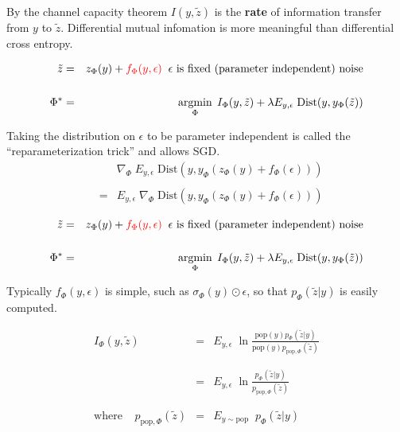 {\vfill
By the channel capacity theorem {\color{red} $I(y,\tilde{z})$} is the {\bf rate} of information transfer from $y$ to $\tilde{z}$.
Differential mutual infomation is more meaningful than differential cross entropy.


\bigskip
\bigskip
\begin{eqnarray*}
\tilde{z} & = & z_\Phi(y) + {\color{red} f_\Phi(y,\epsilon)} \;\;\mbox{$\epsilon$ is fixed (parameter independent) noise} \\
\\
\Phi^* & = & \operatorname*{argmin}_\Phi \;I_\Phi(y,\tilde{z}) + \lambda E_{y,\epsilon}\; \mathrm{Dist}(y,y_\Phi(\tilde{z}))
\end{eqnarray*}

\vfill
Taking the distribution on $\epsilon$ to be parameter independent is called the ``reparameterization trick'' and allows SGD.
\begin{eqnarray*}
& & \nabla_\Phi \;E_{y,\epsilon}\; \mathrm{Dist}(y,y_\Phi(z_\Phi(y) + f_\Phi(\epsilon))) \\
\\
& = & E_{y,\epsilon}\; \nabla_\Phi\;\mathrm{Dist}(y,y_\Phi(z_\Phi(y) + f_\Phi(\epsilon)))
\end{eqnarray*}


\bigskip
\bigskip
\begin{eqnarray*}
\tilde{z} & = & z_\Phi(y) + {\color{red} f_\Phi(y,\epsilon)} \;\;\mbox{$\epsilon$ is fixed (parameter independent) noise} \\
\\
\Phi^* & = & \operatorname*{argmin}_\Phi \;I_\Phi(y,\tilde{z}) + \lambda E_{y,\epsilon}\; \mathrm{Dist}(y,y_\Phi(\tilde{z}))
\end{eqnarray*}

\vfill
Typically $f_\Phi(y,\epsilon)$ is simple, such as $\sigma_\Phi(y)\odot \epsilon$, so that {\color{red} $p_\Phi(\tilde{z}|y)$ is easily computed.}


\begin{eqnarray*}
I_\Phi(y,\tilde{z})  & = & E_{y,\epsilon}\; \ln \frac{\mathrm{pop}(y)p_\Phi(\tilde{z}|y)}{\mathrm{pop}(y)p_{\mathrm{pop},\Phi}(\tilde{z})} \\
\\
\\
& = & E_{y,\epsilon}\;\ln \frac{p_\Phi(\tilde{z}|y)}{p_{\mathrm{pop},\Phi}(\tilde{z})} \\
\\
\\
\mathrm{where}\;\;\;\;p_{\mathrm{pop},\Phi}(\tilde{z}) & = & E_{y\sim \mathrm{pop}}\;\;p_\Phi(\tilde{z}|y)
\end{eqnarray*}

}
